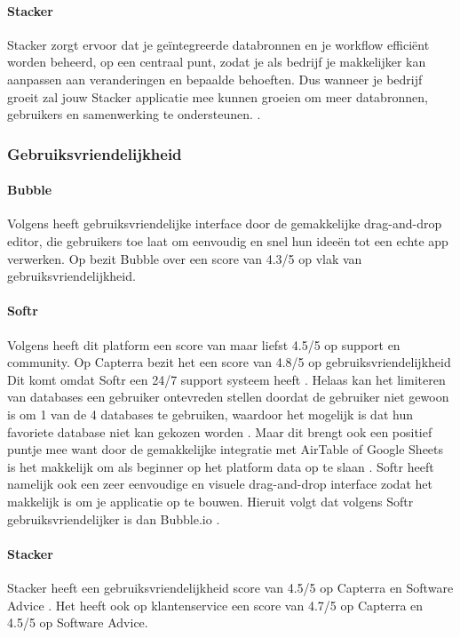 \paragraph{Stacker}
Stacker zorgt ervoor dat je geïntegreerde databronnen en je workflow efficiënt worden beheerd, op een centraal punt, zodat je als bedrijf je makkelijker kan aanpassen aan veranderingen en 
bepaalde behoeften. Dus wanneer je bedrijf groeit zal jouw Stacker applicatie mee kunnen groeien om meer databronnen, gebruikers en samenwerking te ondersteunen. 
\autocite{Noloco2023}.
\subsubsection*{Gebruiksvriendelijkheid}
\paragraph{Bubble}
Volgens\textcite{Czerny2024} 
heeft gebruiksvriendelijke interface door de gemakkelijke drag-and-drop editor, die gebruikers toe laat om eenvoudig en snel hun ideeën tot een echte app verwerken. 
Op \autocite{Capterra}  bezit Bubble over een score van 4.3/5 op vlak van gebruiksvriendelijkheid.
\paragraph{Softr}
Volgens \textcite{Code2023} heeft dit platform een score van maar liefst 4.5/5 op support en community. 
Op Capterra bezit het een score van 4.8/5 op gebruiksvriendelijkheid \autocite{Capterra}
Dit komt omdat Softr een 24/7 support systeem heeft \autocite{Youssef2023}. 
Helaas kan het limiteren van databases een gebruiker ontevreden stellen doordat de gebruiker niet gewoon is om 1 van de 4 databases te gebruiken, 
waardoor het mogelijk is dat hun favoriete database niet kan gekozen worden \autocite{Frater2024}. 
Maar dit brengt ook een positief puntje mee want door de gemakkelijke integratie met AirTable of Google Sheets is het makkelijk om als beginner op het platform data op te slaan \autocite{Code2023}. Softr heeft namelijk ook een zeer eenvoudige en visuele drag-and-drop interface zodat het makkelijk is om je applicatie op te bouwen. Hieruit volgt dat volgens \textcite{Youssef2023} Softr gebruiksvriendelijker is dan Bubble.io .
\paragraph{Stacker}
Stacker heeft een gebruiksvriendelijkheid score van 4.5/5 op Capterra en Software Advice \autocite{Capterra}
\autocite{Advice}. Het heeft ook op klantenservice een score van 4.7/5 op Capterra en 4.5/5 op Software Advice.

